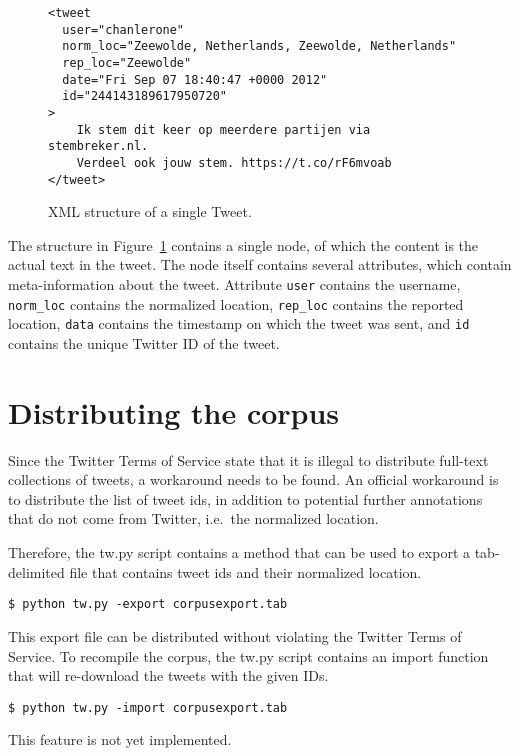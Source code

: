 \documentclass[a4paper,10pt]{article}
\begin{document}
\begin{figure}[htbp]
\begin{verbatim}
<tweet
  user="chanlerone" 
  norm_loc="Zeewolde, Netherlands, Zeewolde, Netherlands" 
  rep_loc="Zeewolde" 
  date="Fri Sep 07 18:40:47 +0000 2012" 
  id="244143189617950720"
>
    Ik stem dit keer op meerdere partijen via stembreker.nl.
    Verdeel ook jouw stem. https://t.co/rF6mvoab
</tweet>

\end{verbatim}
\caption{XML structure of a single Tweet.}
\label{fig:xml}
\end{figure}

The structure in Figure~\ref{fig:xml} contains a single node, of which the content is the actual text in the tweet. The node itself contains several attributes, which contain meta-information about the tweet. Attribute \texttt{user} contains the username, \texttt{norm\_loc} contains the normalized location, \texttt{rep\_loc} contains the reported location, \texttt{data} contains the timestamp on which the tweet was sent, and \texttt{id} contains the unique Twitter ID of the tweet.

\section{Distributing the corpus}

Since the Twitter Terms of Service state that it is illegal to distribute full-text collections of tweets, a workaround needs to be found. An official workaround is to distribute the list of tweet ids, in addition to potential further annotations that do not come from Twitter, i.e.~the normalized location.

Therefore, the tw.py script contains a method that can be used to export a tab-delimited file that contains tweet ids and their normalized location.

\begin{verbatim}
$ python tw.py -export corpusexport.tab
\end{verbatim}

This export file can be distributed without violating the Twitter Terms of Service. To recompile the corpus, the tw.py script contains an import function that will re-download the tweets with the given IDs.

\begin{verbatim}
$ python tw.py -import corpusexport.tab
\end{verbatim}

This feature is not yet implemented.
\end{document}
